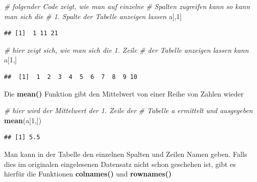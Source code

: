 \documentclass[]{book}
\newenvironment{Shaded}{\begin{snugshade}}{\end{snugshade}}
\newcommand{\KeywordTok}[1]{\textcolor[rgb]{0.13,0.29,0.53}{\textbf{#1}}}
\newcommand{\DecValTok}[1]{\textcolor[rgb]{0.00,0.00,0.81}{#1}}
\newcommand{\CommentTok}[1]{\textcolor[rgb]{0.56,0.35,0.01}{\textit{#1}}}
\newcommand{\NormalTok}[1]{#1}
\begin{document}
\begin{Shaded}
\begin{Highlighting}[]
\CommentTok{# folgender Code zeigt, wie man auf einzelne }
\CommentTok{# Spalten zugreifen kann so kann man sich die }
\CommentTok{# 1. Spalte der Tabelle anzeigen lassen}
\NormalTok{a[,}\DecValTok{1}\NormalTok{]}
\end{Highlighting}
\end{Shaded}

\begin{verbatim}
## [1]  1 11 21
\end{verbatim}

\begin{Shaded}
\begin{Highlighting}[]
\CommentTok{# hier zeigt sich, wie man sich die 1. Zeile }
\CommentTok{# der Tabelle anzeigen lassen kann}
\NormalTok{a[}\DecValTok{1}\NormalTok{,]}
\end{Highlighting}
\end{Shaded}

\begin{verbatim}
##  [1]  1  2  3  4  5  6  7  8  9 10
\end{verbatim}

Die \textbf{mean()} Funktion gibt den Mittelwert von einer Reihe von
Zahlen wieder

\begin{Shaded}
\begin{Highlighting}[]
\CommentTok{# hier wird der Mittelwert der 1. Zeile der }
\CommentTok{# Tabelle a ermittelt und ausgegeben}
\KeywordTok{mean}\NormalTok{(a[}\DecValTok{1}\NormalTok{,])}
\end{Highlighting}
\end{Shaded}

\begin{verbatim}
## [1] 5.5
\end{verbatim}

Man kann in der Tabelle den einzelnen Spalten und Zeilen Namen geben.
Falls dies im originalen eingelesenen Datensatz nicht schon geschehen
ist, gibt es hierfür die Funktionen \textbf{colnames()} und
\textbf{rownames()}
\end{document}
